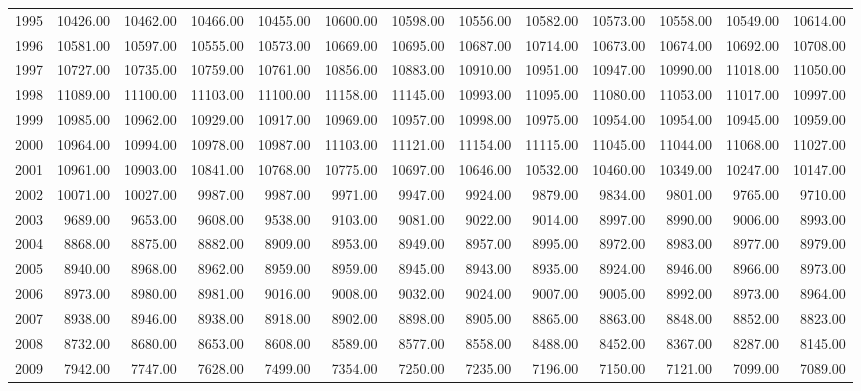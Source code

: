 \begin{longtable}{rrrrrrrrrrrrr}
  1995 & 10426.00 & 10462.00 & 10466.00 & 10455.00 & 10600.00 & 10598.00 & 10556.00 & 10582.00 & 10573.00 & 10558.00 & 10549.00 & 10614.00 \\ 
  1996 & 10581.00 & 10597.00 & 10555.00 & 10573.00 & 10669.00 & 10695.00 & 10687.00 & 10714.00 & 10673.00 & 10674.00 & 10692.00 & 10708.00 \\ 
  1997 & 10727.00 & 10735.00 & 10759.00 & 10761.00 & 10856.00 & 10883.00 & 10910.00 & 10951.00 & 10947.00 & 10990.00 & 11018.00 & 11050.00 \\ 
  1998 & 11089.00 & 11100.00 & 11103.00 & 11100.00 & 11158.00 & 11145.00 & 10993.00 & 11095.00 & 11080.00 & 11053.00 & 11017.00 & 10997.00 \\ 
  1999 & 10985.00 & 10962.00 & 10929.00 & 10917.00 & 10969.00 & 10957.00 & 10998.00 & 10975.00 & 10954.00 & 10954.00 & 10945.00 & 10959.00 \\ 
  2000 & 10964.00 & 10994.00 & 10978.00 & 10987.00 & 11103.00 & 11121.00 & 11154.00 & 11115.00 & 11045.00 & 11044.00 & 11068.00 & 11027.00 \\ 
  2001 & 10961.00 & 10903.00 & 10841.00 & 10768.00 & 10775.00 & 10697.00 & 10646.00 & 10532.00 & 10460.00 & 10349.00 & 10247.00 & 10147.00 \\ 
  2002 & 10071.00 & 10027.00 & 9987.00 & 9987.00 & 9971.00 & 9947.00 & 9924.00 & 9879.00 & 9834.00 & 9801.00 & 9765.00 & 9710.00 \\ 
  2003 & 9689.00 & 9653.00 & 9608.00 & 9538.00 & 9103.00 & 9081.00 & 9022.00 & 9014.00 & 8997.00 & 8990.00 & 9006.00 & 8993.00 \\ 
  2004 & 8868.00 & 8875.00 & 8882.00 & 8909.00 & 8953.00 & 8949.00 & 8957.00 & 8995.00 & 8972.00 & 8983.00 & 8977.00 & 8979.00 \\ 
  2005 & 8940.00 & 8968.00 & 8962.00 & 8959.00 & 8959.00 & 8945.00 & 8943.00 & 8935.00 & 8924.00 & 8946.00 & 8966.00 & 8973.00 \\ 
  2006 & 8973.00 & 8980.00 & 8981.00 & 9016.00 & 9008.00 & 9032.00 & 9024.00 & 9007.00 & 9005.00 & 8992.00 & 8973.00 & 8964.00 \\ 
  2007 & 8938.00 & 8946.00 & 8938.00 & 8918.00 & 8902.00 & 8898.00 & 8905.00 & 8865.00 & 8863.00 & 8848.00 & 8852.00 & 8823.00 \\ 
  2008 & 8732.00 & 8680.00 & 8653.00 & 8608.00 & 8589.00 & 8577.00 & 8558.00 & 8488.00 & 8452.00 & 8367.00 & 8287.00 & 8145.00 \\ 
  2009 & 7942.00 & 7747.00 & 7628.00 & 7499.00 & 7354.00 & 7250.00 & 7235.00 & 7196.00 & 7150.00 & 7121.00 & 7099.00 & 7089.00 \\ 

\end{longtable}
